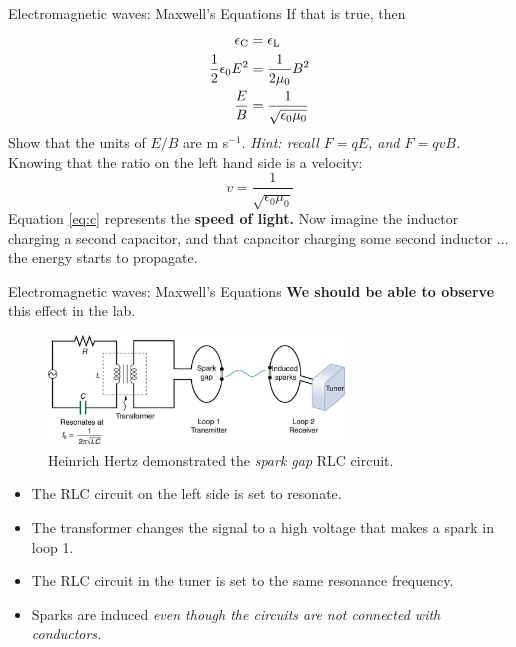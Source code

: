 \documentclass{beamer}
\begin{document}
\begin{frame}{Electromagnetic waves: Maxwell's Equations}
\small
If that is true, then
\begin{align}
\epsilon_{\rm C} &= \epsilon_{\rm L} \\
\frac{1}{2}\epsilon_0 E^2 &= \frac{1}{2\mu_0} B^2 \\
\frac{E}{B} &= \frac{1}{\sqrt{\epsilon_0 \mu_0}}
\end{align}
Show that the units of $E/B$ are m s$^{-1}$.  \textit{Hint: recall $F = qE$, and $F = qvB$.}  Knowing that the ratio on the left hand side is a velocity:
\begin{equation}
\boxed{v = \frac{1}{\sqrt{\epsilon_0 \mu_0}}} \label{eq:c}
\end{equation}
Equation \ref{eq:c} represents the \textbf{\alert{speed of light.}}  Now imagine the inductor charging a second capacitor, and that capacitor charging some second inductor ... the energy starts to propagate.
\end{frame}

\begin{frame}{Electromagnetic waves: Maxwell's Equations}
\textbf{\alert{We should be able to observe}} this effect in the lab.  
\begin{figure}
\centering
\includegraphics[width=0.7\textwidth]{figures/spark.png}
\caption{\label{fig:spark} Heinrich Hertz demonstrated the \textit{spark gap} RLC circuit.}
\end{figure}
\footnotesize
\begin{itemize}
\item The RLC circuit on the left side is set to resonate.
\item The transformer changes the signal to a high voltage that makes a spark in loop 1.
\item The RLC circuit in the tuner is set to the same resonance frequency.
\item Sparks are induced \textit{even though the circuits are not connected with conductors.}
\end{itemize}
\end{frame}
\end{document}
